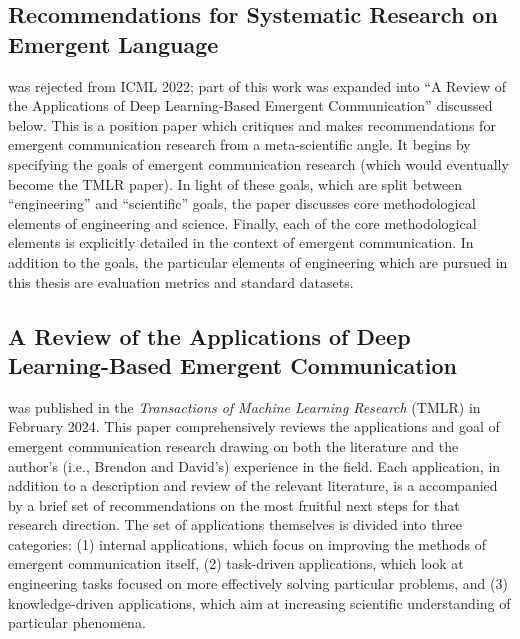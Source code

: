 \subsection{Recommendations for Systematic Research on Emergent Language}
\noindent
\citet{boldt2022recommendations} was rejected from ICML 2022; part of this work was expanded into ``A Review of the Applications of Deep Learning-Based Emergent Communication'' discussed below.
This is a position paper which critiques and makes recommendations for emergent communication research from a meta-scientific angle.
It begins by specifying the goals of emergent communication research (which would eventually become the TMLR paper).
In light of these goals, which are split between ``engineering'' and ``scientific'' goals, the paper discusses core methodological elements of engineering and science.
Finally, each of the core methodological elements is explicitly detailed in the context of emergent communication.
In addition to the goals, the particular elements of engineering which are pursued in this thesis are evaluation metrics and standard datasets.

\subsection{A Review of the Applications of Deep Learning-Based Emergent Communication}

\noindent
\citet{boldt2024review} was published in the \textit{Transactions of Machine Learning Research} (TMLR) in February 2024.
This paper comprehensively reviews the applications and goal of emergent communication research drawing on both the literature and the author's (i.e., Brendon and David's) experience in the field.
Each application, in addition to a description and review of the relevant literature, is a accompanied by a brief set of recommendations on the most fruitful next steps for that research direction.
The set of applications themselves is divided into three categories:
  (1) internal applications, which focus on improving the methods of emergent communication itself,
  (2) task-driven applications, which look at engineering tasks focused on more effectively solving particular problems,
  and (3) knowledge-driven applications, which aim at increasing scientific understanding of particular phenomena.


